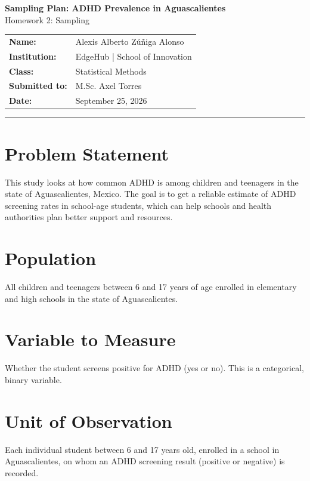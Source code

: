 \documentclass[11pt]{article}
\begin{document}
\begin{center}
    {\LARGE\bfseries\color{accent} Sampling Plan: ADHD Prevalence in Aguascalientes}\\[0.4em]
    {\large Homework 2: Sampling}
\end{center}

\vspace{0.5em}

\begin{center}
\begin{tabular}{ll}
\textbf{Name:} & Alexis Alberto Z\'u\~niga Alonso \\
\textbf{Institution:} & EdgeHub | School of Innovation \\
\textbf{Class:} & Statistical Methods \\
\textbf{Submitted to:} & M.Sc. Axel Torres \\
\textbf{Date:} & September 25, 2026 \\
\end{tabular}
\end{center}

\vspace{0.4em}
\hrule
\vspace{0.2em}

\section{Problem Statement}
This study looks at how common ADHD is among children and teenagers in the state of Aguascalientes, Mexico. The goal is to get a reliable estimate of ADHD screening rates in school-age students, which can help schools and health authorities plan better support and resources.

\section{Population}
All children and teenagers between 6 and 17 years of age enrolled in elementary and high schools in the state of Aguascalientes.

\section{Variable to Measure}
Whether the student screens positive for ADHD (yes or no). This is a categorical, binary variable.

\section{Unit of Observation}
Each individual student between 6 and 17 years old, enrolled in a school in Aguascalientes, on whom an ADHD screening result (positive or negative) is recorded.
\end{document}
